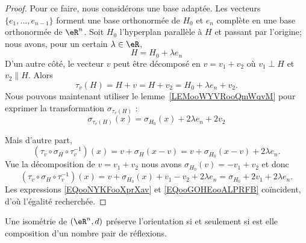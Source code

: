 \begin{proof}
	Pour ce faire, nous considérons une base adaptée. Les vecteurs \( \{ e_1,\ldots, e_{n-1} \}\) forment une base orthonormée de \( H_0\) et \( e_n\) complète en une base orthonormée de \( \eR^n\). Soit \( H_0\) l'hyperplan parallèle à \( H\) et passant par l'origine; nous avons, pour un certain \( \lambda\in \eR\),
	\begin{equation}
		H=H_0+\lambda e_n
	\end{equation}
	D'un autre côté, le vecteur \( v\) peut être décomposé en \( v=v_1+v_2\) où \( v_1\perp H\) et \( v_2\parallel H\). Alors
	\begin{equation}
		\tau_v(H)=H+v=H+v_2=H_0+\lambda e_n+v_2.
	\end{equation}
	Nous pouvons maintenant utiliser le lemme~\ref{LEMooWYVRooQmWqvM} pour exprimer la transformation \( \sigma_{\tau_v(H)}\) :
	\begin{equation}        \label{EQooNYKFooXprXav}
		\sigma_{\tau_v(H)}(x)=\sigma_{H_0}(x)+ 2\lambda e_n+2v_2
	\end{equation}

	Mais d'autre part,
	\begin{equation}
		(\tau_v\circ \sigma_H\circ\tau_{v}^{-1})(x)=v+\sigma_H(x-v)=v+\sigma_{H_0}(x-v)+2\lambda e_n.
	\end{equation}
	Vue la décomposition de \( v=v_1+v_2\) nous avons \( \sigma_{H_0}(v)=-v_1+v_2\) et donc
	\begin{equation}        \label{EQooGOHEooALPRFB}
		(\tau_v\circ \sigma_H\circ\tau_{v}^{-1})(x)= v+  \sigma_{H_0}(x)+v_1-v_2+2\lambda e_n=\sigma_{H_0}+2v_1+2\lambda e_n.
	\end{equation}
	Les expressions \eqref{EQooNYKFooXprXav} et \eqref{EQooGOHEooALPRFB} coïncident, d'où l'égalité recherchée.
\end{proof}

\begin{theorem}      \label{THOooWBIYooCtWoSq}
	Une isométrie de \( (\eR^n,d)\) préserve l'orientation si et seulement si est elle composition d'un nombre pair de réflexions.
\end{theorem}

